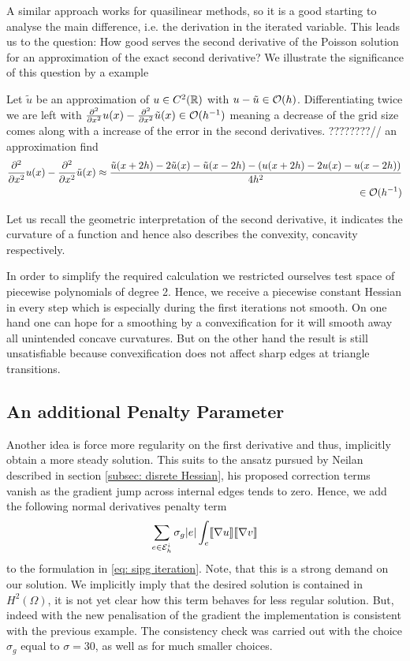 A similar approach works for quasilinear methods, so it is a good starting to analyse the main difference, i.e. the derivation in the iterated variable. This leads us to the question: How good serves the second derivative of the Poisson solution for an approximation of the exact second derivative?
We illustrate the significance of this question by a example
\begin{example}
	Let $\tilde u$ be an approximation of $u\in C^2(\mathbb{R})$ with $u-\tilde u \in \mathcal{O}(h)$. Differentiating twice we are left with $\frac {\partial^2} {\partial {x}^2} u(x)-\frac {\partial^2} {\partial {x}^2} \tilde u(x)\in \mathcal{O}(h^{-1})$ meaning a decrease of the grid size comes along with a increase of the error in the second derivatives.
	????????//
	 an approximation find
	\begin{align*}
		\frac {\partial^2} {\partial {x}^2} u(x)-\frac {\partial^2} {\partial {x}^2} \tilde u(x) \approx \frac{\tilde u(x+2h) - 2\tilde u(x) - \tilde u(x-2h) - (u(x+2h) - 2u(x) - u(x-2h))} {4h^2} \\
		 \in \mathcal{O}(h^{-1})
	\end{align*}
\end{example}
Let us recall the geometric interpretation of the second derivative, it indicates the curvature of a function and hence also describes the convexity, concavity respectively.

In order to simplify the required calculation we restricted ourselves test space of piecewise polynomials of degree 2. Hence, we receive a piecewise constant Hessian in every step which is especially during the first iterations not smooth.
On one hand one can hope for a smoothing by a convexification for it will smooth away all unintended concave curvatures. But on the other hand the result is still unsatisfiable because convexification does not affect sharp edges at triangle transitions.

\subsection{An additional Penalty Parameter}
Another idea is force more regularity on the first derivative and thus, implicitly obtain a more steady solution. This suits to the ansatz pursued by Neilan described in section \ref{subsec: disrete Hessian}, his proposed correction terms vanish as the gradient jump across internal edges tends to zero.
Hence, we add the following normal derivatives penalty term 
\begin{align}
	\sum_{e \in \mathcal{E}_h^i} \sigma_g |e |\int_e \llbracket  \nabla u \rrbracket \llbracket \nabla v \rrbracket \label{eq: grad penalty term}
\end{align}
to the formulation in \eqref{eq: sipg iteration}.
Note, that this is a strong demand on our solution. We implicitly imply that the desired solution is contained in $H^2(\Omega)$, it is not yet clear how this term behaves for less regular solution.
But, indeed with the new penalisation of the gradient the implementation is consistent with the previous example. The consistency check was carried out with the choice $\sigma_g$ equal to $\sigma=30$, as well as for much smaller choices.

